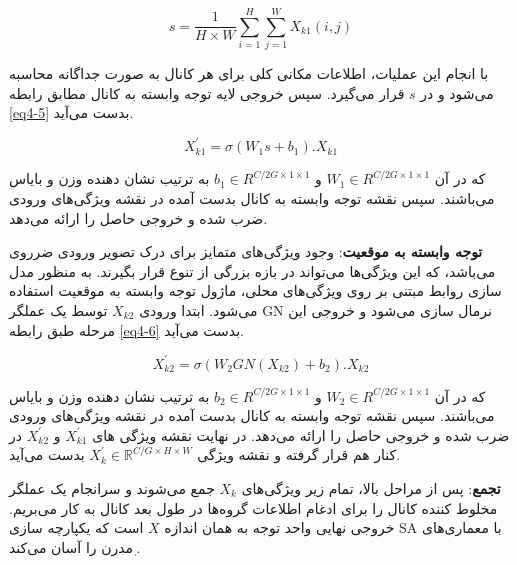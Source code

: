 \begin{equation}
s = \frac{1}{H \times W}\sum_{i=1}^{H} \sum_{j=1}^{W} X_{k1} (i, j)
\label{eq4-4}
\end{equation}

\noindent
با انجام این عملیات، اطلاعات مکانی کلی برای هر کانال به صورت جداگانه محاسبه می‌شود و در $s$ قرار می‌گیرد. سپس خروجی لایه توجه وابسته به کانال مطابق رابطه \ref{eq4-5} بدست ‌می‌آید. 

\begin{equation}
X^{\prime}_{k1} = \sigma(W_1 s + b_1) . X_{k1}
\label{eq4-5}
\end{equation}

\noindent
که در آن $W_1\in R^{C/2G \times 1 \times 1} $  و  $b_1\in R^{C/2G \times 1 \times 1} $ به ترتیب نشان دهنده وزن و بایاس می‌باشند. ‌‌‌سپس نقشه توجه وابسته به کانال بدست آمده در نقشه ویژگی‌های ورودی ضرب شده و خروجی حاصل را ارائه می‌دهد.

\textbf{توجه وابسته به موقعیت}: 
وجود ویژگی‌های متمایز برای درک تصویر ورودی ضرروی می‌باشد، که این ویژگی‌ها می‌تواند در بازه بزرگی از تنوع قرار بگیرند. به منظور مدل سازی روابط مبتنی  بر روی ویژگی‌های محلی، ماژول توجه وابسته به موقعیت استفاده می‌شود. ابتدا ورودی $X_{k2}$ توسط یک عملگر GN  نرمال سازی می‌شود و خروجی این مرحله طبق رابطه \ref{eq4-6} بدست می‌آید.

\begin{equation}
X^{\prime}_{k2} = \sigma(W_2 GN(X_{k2}) + b_2) . X_{k2}
\label{eq4-6}
\end{equation}

\noindent
که در آن $W_2\in R^{C/2G \times 1 \times 1} $  و  $b_2\in R^{C/2G \times 1 \times 1} $ به ترتیب نشان دهنده وزن و بایاس می‌باشند. ‌‌‌سپس نقشه توجه وابسته به کانال بدست آمده در نقشه ویژگی‌های ورودی ضرب شده و خروجی حاصل را ارائه می‌دهد. در نهایت نقشه ویژگی های  $X^{\prime}_{k1}$ و $X^{\prime}_{k2}$ در کنار هم قرار گرفته و نقشه ویژگی 
$X^{\prime}_{k} \in \mathbb{R}^{C/G \times H \times W}$
بدست می‌آید. 

\textbf{تجمع}: 
پس از مراحل بالا، تمام زیر ویژگی‌های $X_k$ جمع می‌شوند و سرانجام یک عملگر مخلوط کننده کانال  را برای ادغام اطلاعات گروه‌ها در طول بعد کانال به کار می‌بریم. خروجی نهایی واحد توجه به همان اندازه $X$ است که یکپارچه سازی SA با معماری‌های مدرن را آسان می‌‌کند ٖ\cite{yang2021sanet}.

